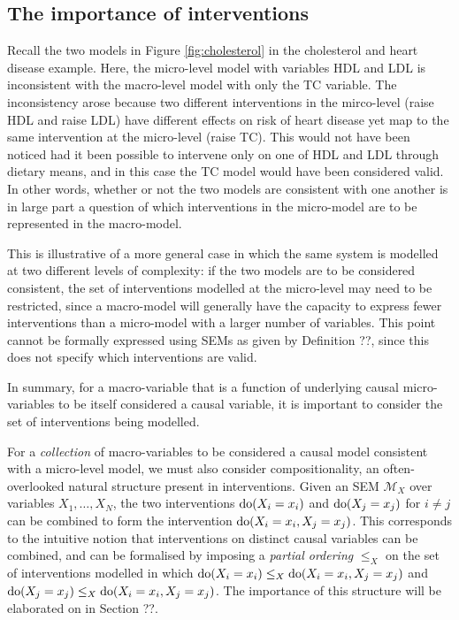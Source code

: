 
\subsection{The importance of interventions}

Recall the two models in Figure \ref{fig:cholesterol} in the cholesterol and heart disease example. 
Here, the micro-level model with variables HDL and LDL is inconsistent with the macro-level model with only the TC variable. 
The inconsistency arose because two different interventions in the mirco-level (raise HDL and raise LDL) have different effects on risk of heart disease yet map to the same intervention at the micro-level (raise TC).
This would not have been noticed had it been possible to intervene only on one of HDL and LDL through dietary means, and in this case the TC model would have been considered valid.
In other words, whether or not the two models are consistent with one another is in large part a question of which interventions in the micro-model are to be represented in the macro-model.

This is illustrative of a more general case in which the same system is modelled at two different levels of complexity: if the two models are to be considered consistent, the set of interventions modelled at the micro-level may need to be restricted, since a macro-model will generally have the capacity to express fewer interventions than a micro-model with a larger number of variables. 
This point cannot be formally expressed using SEMs as given by Definition ??, since this does not specify which interventions are valid. 

In summary, for a macro-variable that is a function of underlying causal micro-variables to be itself considered a causal variable, it is important to consider the set of interventions being modelled.

For a \emph{collection} of macro-variables to be considered a causal model consistent with a micro-level model, we must also consider compositionality, an often-overlooked natural structure present in interventions.
Given an SEM $\mathcal{M}_X$ over variables $X_1, \ldots, X_N$, the two interventions $\operatorname{do}(X_i=x_i)$ and $\operatorname{do}(X_j=x_j)$ for $i\not=j$  can be combined to form the intervention $\operatorname{do}(X_i=x_i, X_j=x_j)$. 
This corresponds to the intuitive notion that interventions on distinct causal variables can be combined, and can be formalised by imposing a \emph{partial ordering} $\leq_X$ on the set of interventions modelled in which $\operatorname{do}(X_i=x_i) \leq_X \operatorname{do}(X_i=x_i, X_j=x_j)$ and $\operatorname{do}(X_j=x_j) \leq_X \operatorname{do}(X_i=x_i, X_j=x_j)$. 
The importance of this structure will be elaborated on in Section ??.


